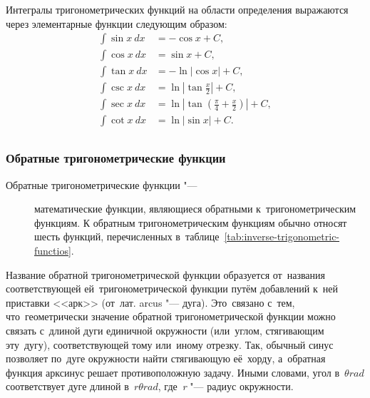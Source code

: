 \documentclass[]{scrartcl}
\begin{document}
%
Интегралы тригонометрических функций на области определения выражаются через элементарные функции следующим образом:
\begin{equation}\label{eq:trigonometric-functions-integrals}
	\begin{aligned}
	\int \sin x\ dx &= -\cos x + C,\\
	\int \cos x\ dx &=  \sin x + C,\\
	\int \tan x\ dx &= -\ln|\cos x| + C,\\
	\int \csc x\ dx &=  \ln|\tan \frac{x}{2}| + C,\\
	\int \sec x\ dx &=  \ln|\tan (\frac{\pi}{4} + \frac{x}{2})| + C,\\ 
	\int \cot x\ dx &=  \ln|\sin x| + C.\\	
	\end{aligned}
\end{equation}
%
\subsubsection{Обратные тригонометрические функции}
\begin{description}
	\item[Обратные тригонометрические функции "---] математические функции, являющиеся обратными к~тригонометрическим функциям. К обратным тригонометрическим функциям обычно относят шесть функций, перечисленных в~таблице~\ref{tab:inverse-trigonometric-functios}.
\end{description}
Название обратной тригонометрической функции образуется от~названия соответствующей ей~тригонометрической функции путём добавлений к~ней~ приставки <<арк>> (от~лат. arcus "--- дуга). Это~связано с~тем, что~геометрически значение обратной тригонометрической функции можно связать с~длиной дуги единичной окружности (или~углом, стягивающим эту~дугу), соответствующей тому или~иному отрезку. Так, обычный синус позволяет по~дуге окружности найти стягивающую её~хорду, а~обратная функция арксинус решает противоположную задачу. Иными словами, угол в~${\textstyle \theta rad}$ соответствует дуге длиной в~${\textstyle r\theta rad}$, где~\textit{r} "--- радиус окружности.
\end{document}
